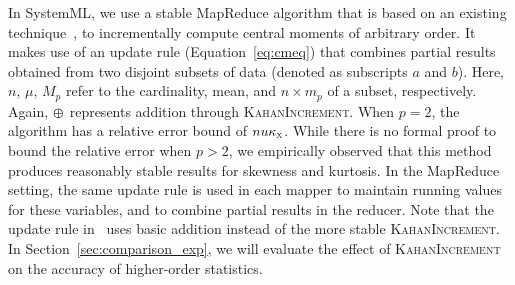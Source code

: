 
In SystemML, we use a stable MapReduce algorithm that is based on an existing technique~\cite{cm}, to incrementally compute central moments of arbitrary order. It makes use of an update rule (Equation~\ref{eq:cmeq}) that combines partial results obtained from two disjoint subsets of data (denoted as subscripts $a$ and $b$). Here, $n$, $\mu$, $M_p$ refer to the cardinality, mean, and $n\times m_p$ of a subset, respectively. Again, $\varoplus$ represents addition through \textsc{KahanIncrement}. When $p=2$, the algorithm has a relative error bound of $nu\kappa_\textsc{x}$. While there is no formal proof to bound the relative error when $p > 2$, we empirically observed that this method produces reasonably stable results for skewness and kurtosis. In the MapReduce setting, the same update rule is used in each mapper to maintain running values for these variables, and to combine partial results in the reducer. Note that the update rule in~\cite{cm} uses basic addition instead of the more stable \textsc{KahanIncrement}. In Section~\ref{sec:comparison_exp}, we will evaluate the effect of \textsc{KahanIncrement} on the accuracy of higher-order statistics.
 
